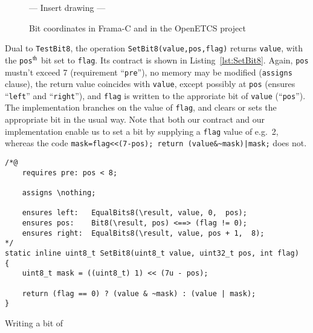 \begin{figure}
\begin{center}
\vspace*{2cm}
--- Insert drawing --- 
\vspace*{2cm}
\caption{\label{fig:bit coords}
        Bit coordinates in Frama-C and in the OpenETCS project}
\end{center}
\end{figure}






Dual to \lstinline{TestBit8}, the operation \lstinline{SetBit8(value,pos,flag)}
returns \lstinline{value}, with the \lstinline{pos}$^{\mbox{\scriptsize th}}$ bit
set to \lstinline{flag}.
%
Its contract is shown in Listing~\ref{lst:SetBit8}.
%
Again, \lstinline{pos} mustn't exceed 7 (requirement ``\lstinline{pre}''),
no memory may be modified (\lstinline{assigns} clause),
the return value coincides with \lstinline{value}, except possibly at \lstinline{pos}
(ensures ``\lstinline{left}'' and ``\lstinline{right}''),
and \lstinline{flag} is written to the approriate bit of \lstinline{value}
(``\lstinline{pos}'').
%
The implementation branches on the value of \lstinline{flag}, and clears or sets the
appropriate bit in the usual way.
%
Note that both our contract and our implementation enable us to set a bit by supplying a
\lstinline{flag} value of e.g.\ 2, whereas the code 
\lstinline{mask=flag<<(7-pos); return (value&~mask)|mask;} does not.





\begin{listing}[hbt]
\begin{minipage}{0.99\textwidth}
\begin{lstlisting}[style=acsl-block]
/*@
    requires pre: pos < 8;

    assigns \nothing;

    ensures left:   EqualBits8(\result, value, 0,  pos);
    ensures pos:    Bit8(\result, pos) <==> (flag != 0);
    ensures right:  EqualBits8(\result, value, pos + 1,  8);
*/
static inline uint8_t SetBit8(uint8_t value, uint32_t pos, int flag)
{
    uint8_t mask = ((uint8_t) 1) << (7u - pos);

    return (flag == 0) ? (value & ~mask) : (value | mask);
}
\end{lstlisting}
\end{minipage}
\caption{\label{lst:SetBit8}Writing a bit of }
\end{listing}























